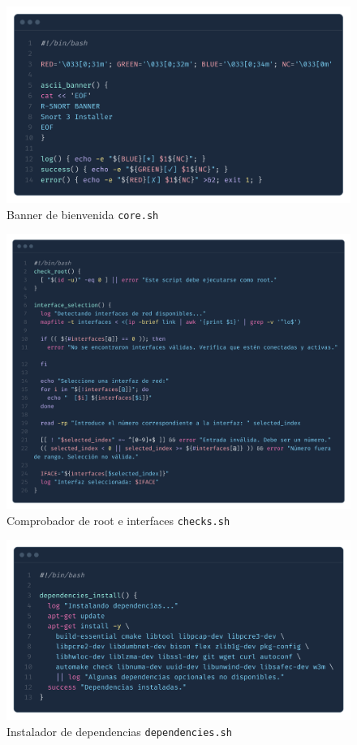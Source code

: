 \documentclass[11pt,a4paper,twoside]{report}
\begin{document}
\begin{figure}[H]
	\centering
	\includegraphics[scale=0.12]{script_automatico/2.png}
	\caption{Banner de bienvenida \texttt{core.sh}}
	\label{fig:core-sh}
\end{figure}

\begin{figure}[H]
	\centering
	\includegraphics[scale=0.12]{script_automatico/3.png}
	\caption{Comprobador de root e interfaces \texttt{checks.sh}}
	\label{fig:checks-sh}
\end{figure}

\begin{figure}[H]
	\centering
	\includegraphics[scale=0.12]{script_automatico/4.png}
	\caption{Instalador de dependencias \texttt{dependencies.sh}}
	\label{fig:dependencies-sh}
\end{figure}
\end{document}
